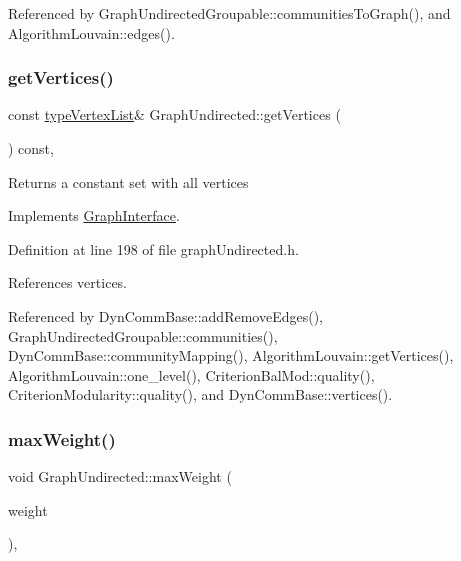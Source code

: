 Referenced by Graph\+Undirected\+Groupable\+::communities\+To\+Graph(), and Algorithm\+Louvain\+::edges().

\mbox{\label{classGraphUndirected_af2f65109919c878a1fd7637d3bfe0991}} 
\subsubsection{\texorpdfstring{get\+Vertices()}{getVertices()}}
{\footnotesize\ttfamily const \hyperlink{graphInterface_8h_a21d54d8a139def524d3b0d6f71ec4974}{type\+Vertex\+List}\& Graph\+Undirected\+::get\+Vertices (\begin{DoxyParamCaption}{ }\end{DoxyParamCaption}) const\hspace{0.3cm}{\ttfamily [inline]}, {\ttfamily [virtual]}}

\begin{DoxyReturn}{Returns}
a constant set with all vertices 
\end{DoxyReturn}


Implements \hyperlink{classGraphInterface_a94af429415c22cba42ecf5a97ee6b5c3}{Graph\+Interface}.



Definition at line 198 of file graph\+Undirected.\+h.



References vertices.



Referenced by Dyn\+Comm\+Base\+::add\+Remove\+Edges(), Graph\+Undirected\+Groupable\+::communities(), Dyn\+Comm\+Base\+::community\+Mapping(), Algorithm\+Louvain\+::get\+Vertices(), Algorithm\+Louvain\+::one\+\_\+level(), Criterion\+Bal\+Mod\+::quality(), Criterion\+Modularity\+::quality(), and Dyn\+Comm\+Base\+::vertices().

\mbox{\label{classGraphUndirected_a99cc719c89bd4afb612cdae920939a00}} 
\subsubsection{\texorpdfstring{max\+Weight()}{maxWeight()}\hspace{0.1cm}{\footnotesize\ttfamily [1/2]}}
{\footnotesize\ttfamily void Graph\+Undirected\+::max\+Weight (\begin{DoxyParamCaption}\item[{const \hyperlink{edge_8h_a2e7ea3be891ac8b52f749ec73fee6dd2}{type\+Weight} \&}]{weight }\end{DoxyParamCaption})\hspace{0.3cm}{\ttfamily [inline]}, {\ttfamily [private]}}



